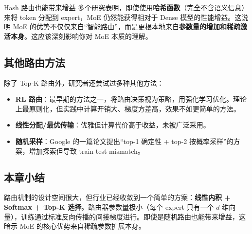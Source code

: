 \begin{warningbox}{Hash 路由也能带来增益}
多个研究表明，即使使用\textbf{哈希函数}（完全不含语义信息）来将 token 分配到 expert，MoE 仍然能获得相对于 Dense 模型的性能增益。这说明 MoE 的优势不仅仅来自``智能路由''，而是更根本地来自\textbf{参数量的增加和稀疏激活本身}。这应该深刻影响你对 MoE 本质的理解。
\end{warningbox}

\subsection{其他路由方法}

除了 Top-K 路由外，研究者还尝试过多种其他方法：

\begin{itemize}
    \item \textbf{RL 路由}：最早期的方法之一，将路由决策视为策略，用强化学习优化。理论上最原则化，但实践中计算开销大、梯度方差高，效果不如更简单的方法。
    \item \textbf{线性分配/最优传输}：优雅但计算代价高于收益，未被广泛采用。
    \item \textbf{随机采样}：Google 的一篇论文提出``top-1 确定性 + top-2 按概率采样''的方案，增加探索但导致 train-test mismatch。
\end{itemize}

\subsection{本章小结}

路由机制的设计空间很大，但行业已经收敛到一个简单的方案：\textbf{线性内积 + Softmax + Top-K 选择}。路由器参数量极小（每个 expert 只有一个 $d$ 维向量），训练通过标准反向传播的间接梯度进行。即使是随机路由也能带来增益，这暗示 MoE 的核心优势来自稀疏参数扩展本身。


